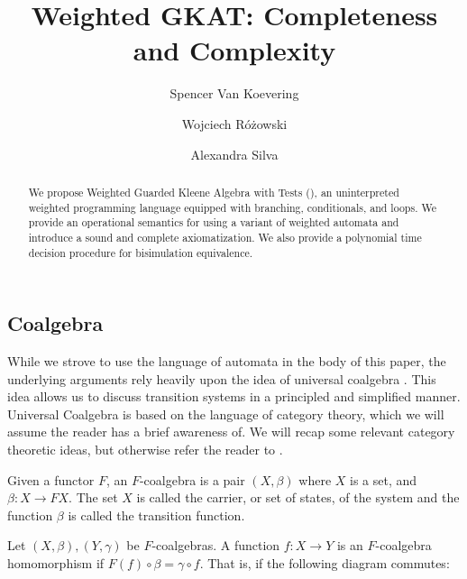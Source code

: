 \documentclass[a4paper,UKenglish,cleveref, autoref, thm-restate]{lipics-v2021}
\title{Weighted GKAT: Completeness and Complexity}
\author{Spencer Van Koevering}{Cornell University, United States of America \and \url{https://spencerkoevering.github.io/}} {sv493@cornell.edu}{https://orcid.org/0009-0008-5026-8060}{Partially supported by a Cornell Bowers CIS Deans Excellence Fellowship.}\author{Wojciech {Różowski}}{University College London, United Kingdom \and \url{https://wkrozowski.github.io/}}{w.rozowski@cs.ucl.ac.uk}{https://orcid.org/0000-0002-8241-7277}{Partially supported by ERC grant Autoprobe (grant agreement 101002697).}
\author{Alexandra Silva}{Cornell University, United States of America \and \url{https://alexandrasilva.org/}}{alexandra.silva@cornell.edu}{https://orcid.org/0000-0001-5014-9784}{Partially supported by ONR grant N68335-22-C-0411, ERC grant 101002697, and a Royal Society Wolfson fellowship.}
\newcommand{\wgkat}{\textsf{\upshape{wGKAT}}\xspace}
\theoremstyle{plain}\newtheoremrep{thm}{Theorem}[section]
\begin{document}
	
	\maketitle

	\begin{abstract}
	 We propose Weighted Guarded Kleene Algebra with Tests (\wgkat), an uninterpreted weighted programming language equipped with branching, conditionals, and loops. We provide an operational semantics for \wgkat using a variant of weighted automata and introduce a sound and complete axiomatization. We also provide a polynomial time decision procedure for  bisimulation equivalence.	\end{abstract}

		\begin{toappendix}
			\section{Coalgebra}\label{AppCoalg}
			While we strove to use the language of automata in the body of this paper, the underlying arguments rely heavily upon the idea of universal coalgebra \cite{Rutten2000UniversalCA}. This idea allows us to discuss transition systems in a principled and simplified manner. Universal Coalgebra is based on the language of category theory, which we will assume the reader has a brief awareness of. We will recap some relevant category theoretic ideas, but otherwise refer the reader to \cite{awodey2010category}.
			
			\begin{defn}
				Given a functor $F$, an $F$-coalgebra is a pair $(X, \beta)$ where $X$ is a set, and $\beta:X \to FX$. The set $X$ is called the carrier, or set of states, of the system and the function $\beta$ is called the transition function. 
			\end{defn}
			\begin{defn}
				Let $(X, \beta), (Y, \gamma)$ be $F$-coalgebras. A function $f: X \to Y$ is an $F$-coalgebra homomorphism if $F(f)\circ \beta = \gamma \circ f$. That is, if the following diagram commutes:
				\begin{center}
			\end{center}
			\end{defn}
			

\end{toappendix}
\end{document}
